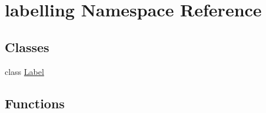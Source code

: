 \hypertarget{namespacelabelling}{}\section{labelling Namespace Reference}
\label{namespacelabelling}
\subsection*{Classes}
\begin{DoxyCompactItemize}
\item 
class \hyperlink{classlabelling_1_1Label}{Label}
\end{DoxyCompactItemize}
\subsection*{Functions}
